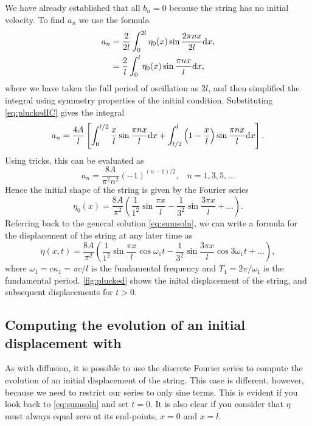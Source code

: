 \documentclass[11pt,twoside,a4paper]{article}
\begin{document}
We have already established that all $b_n=0$ because the string has no
initial velocity.  To find $a_n$ we use the formula
\begin{align}
  a_n &= \frac{2}{2l}\int_0^{2l}\eta_0(x)\sin\frac{2\pi nx}{2l}\textrm{d} x,\nonumber\\
      &= \frac{2}{l}\int_0^{l}\eta_0(x)\sin\frac{\pi nx}{l}\textrm{d} x,
\end{align}
where we have taken the full period of oscillation as $2l$, and then
simplified the integral using symmetry properties of the initial
condition.  Substituting \autoref{eq:pluckedIC} gives the integral
\begin{displaymath}
  a_n = \frac{4A}{l}\left[\int_0^{l/2}\frac{x}{l}\sin\frac{\pi nx}{l}\textrm{d} x + 
    \int_{l/2}^l\left(1-\frac{x}{l}\right)\sin\frac{\pi nx}{l}\textrm{d} x\right].
\end{displaymath}
Using tricks, this can be evaluated as
\begin{equation}
  \label{eq:4}
  a_n = \frac{8A}{\pi^2n^2}(-1)^{(n-1)/2},\;\;\;n=1,3,5,...
\end{equation}
Hence the initial shape of the string is given by the Fourier series
\begin{equation}
  \label{eq:5}
  \eta_0(x) = \frac{8A}{\pi^2}\left(\frac{1}{1^2}\sin\frac{\pi x}{l} - 
    \frac{1}{3^2}\sin\frac{3\pi x}{l} + ...\right).
\end{equation}
Referring back to the general solution \autoref{eq:sumsoln}, we can
write a formula for the displacement of the string at any later time
as
\begin{equation}
  \label{eq:6}
  \eta(x,t) = \frac{8A}{\pi^2}\left(\frac{1}{1^2}\sin\frac{\pi x}{l}\cos\omega_1t - 
    \frac{1}{3^2}\sin\frac{3\pi x}{l}\cos 3\omega_1t + ...\right),
\end{equation}
where $\omega_1 = c\kappa_1 = \pi c/l$ is the fundamental frequency
and $T_1 = 2\pi/\omega_1$ is the fundamental
period. \autoref{fig:plucked} shows the inital displacement of the
string, and subsequent displacements for $t>0$.

\subsection{Computing the evolution of an initial displacement with
  \Mlab}

As with diffusion, it is possible to use the discrete Fourier series
to compute the evolution of an initial displacement of the string.
This case is different, however, because we need to restrict our
series to only sine terms.  This is evident if you look back to
\autoref{eq:sumsoln} and set $t=0$.  It is also clear if you consider
that $\eta$ must always equal zero at its end-points, $x=0$ and $x=l$.
\end{document}
